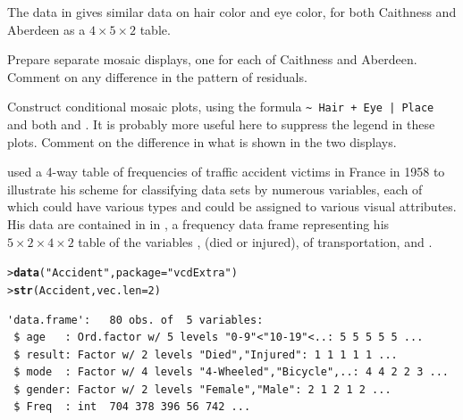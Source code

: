 \documentclass[10pt]{report}\usepackage[]{graphicx}\usepackage[]{color}
\makeatletter
\newcommand{\hlnum}[1]{\textcolor[rgb]{0.686,0.059,0.569}{#1}}%
\newcommand{\hlstr}[1]{\textcolor[rgb]{0.192,0.494,0.8}{#1}}%
\newcommand{\hlstd}[1]{\textcolor[rgb]{0.345,0.345,0.345}{#1}}%
\newcommand{\hlkwc}[1]{\textcolor[rgb]{0.333,0.667,0.333}{#1}}%
\newcommand{\hlkwd}[1]{\textcolor[rgb]{0.737,0.353,0.396}{\textbf{#1}}}%
\newenvironment{kframe}{%
 \def\at@end@of@kframe{}%
 \ifinner\ifhmode%
  \def\at@end@of@kframe{\end{minipage}}%
  \begin{minipage}{\columnwidth}%
 \fi\fi%
 \def\FrameCommand##1{\hskip\@totalleftmargin \hskip-\fboxsep
 \colorbox{shadecolor}{##1}\hskip-\fboxsep
     \hskip-\linewidth \hskip-\@totalleftmargin \hskip\columnwidth}%
 \MakeFramed {\advance\hsize-\width
   \@totalleftmargin\z@ \linewidth\hsize
   \@setminipage}}%
 {\par\unskip\endMakeFramed%
 \at@end@of@kframe}
\newenvironment{knitrout}{}{} %
\renewenvironment{knitrout}{\small\renewcommand{\baselinestretch}{.85}}{} %
\makeatother
\begin{document}
\begin{Exercises}
\begin{enumerate*}
  \end{enumerate*}
  

  \exercise The  data in  gives similar data on hair color and eye color, for both
  Caithness and Aberdeen as a $4 \times 5 \times 2$ table.
  \begin{enumerate*}
    \item Prepare separate mosaic displays, one for each of Caithness and Aberdeen.  Comment on any difference in
    the pattern of residuals.
    \begin{ans}
    \end{ans}
    
    \item Construct conditional mosaic plots, using the formula
      \verb/~ Hair + Eye | Place/ and both  and
    . It is probably more useful here to suppress the legend in these plots.  Comment on the
    difference in what is shown in the two displays.
    \begin{ans}
    \end{ans}
    
  \end{enumerate*}
  

  \exercise\label{lab:mosaic-accident} \citet[pp. 30--31]{Bertin:83} used a 4-way table of frequencies of traffic accident victims in France in 1958
  to illustrate his scheme for classifying data sets by numerous variables, each of which could have various types
  and could be assigned to various visual attributes. His data are contained in  in ,
  a frequency data frame representing his $5 \times 2 \times 4 \times 2$ table of the variables
  ,  (died or injured),  of transportation, and .
\begin{knitrout}\footnotesize
{}\color{fgcolor}\begin{kframe}
\begin{alltt}
\hlstd{> }\hlkwd{data}\hlstd{(}\hlstr{"Accident"}\hlstd{,} \hlkwc{package} \hlstd{=} \hlstr{"vcdExtra"}\hlstd{)}
\hlstd{> }\hlkwd{str}\hlstd{(Accident,} \hlkwc{vec.len}\hlstd{=}\hlnum{2}\hlstd{)}
\end{alltt}
\begin{verbatim}
'data.frame':	80 obs. of  5 variables:
 $ age   : Ord.factor w/ 5 levels "0-9"<"10-19"<..: 5 5 5 5 5 ...
 $ result: Factor w/ 2 levels "Died","Injured": 1 1 1 1 1 ...
 $ mode  : Factor w/ 4 levels "4-Wheeled","Bicycle",..: 4 4 2 2 3 ...
 $ gender: Factor w/ 2 levels "Female","Male": 2 1 2 1 2 ...
 $ Freq  : int  704 378 396 56 742 ...
\end{verbatim}
\end{kframe}
\end{knitrout}
    \begin{enumerate*}
    

\end{enumerate*}
\end{Exercises}
\end{document}
